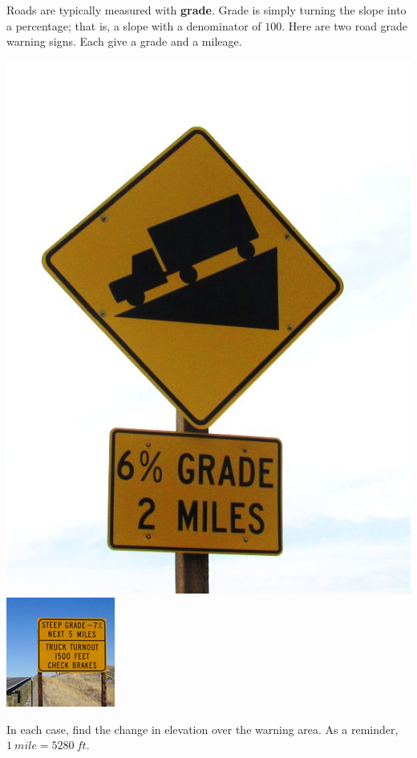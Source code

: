 \documentclass[noauthor,nooutcomes,hints,handout]{ximera}
\begin{document}
\begin{question}
Roads are typically measured with \textbf{grade}. Grade is simply
turning the slope into a percentage; that is, a slope with a
denominator of $100$.  Here are two road grade warning signs. Each
give a grade and a mileage.
\begin{center}
\includegraphics[width=.4\textwidth]{gradeWarning}
\includegraphics[width=.3\textwidth]{truckGradeWarning}
\end{center}
In each case, find the change in elevation over the warning area. As a reminder, $1\ mile=5280\ ft.$
\end{question}
\end{document}
